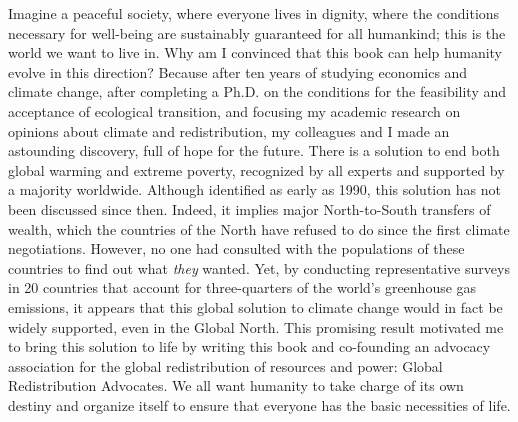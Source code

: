 \documentclass[a5paper,english,openany]{memoir}
\begin{document}
Imagine a peaceful society, where everyone lives in dignity, where the conditions necessary for well-being are sustainably guaranteed for all humankind; this is the world we want to live in.
Why am I convinced that this book can help humanity evolve in this direction? Because after ten years of studying economics and climate change, after completing a Ph.D. %
on the conditions for the feasibility and acceptance of ecological transition, %
and focusing my academic research on opinions about climate and redistribution, my colleagues and I made an astounding discovery, full of hope for the future. %
There is a solution to end both global warming and extreme poverty, recognized %
by all %
experts and supported by a majority worldwide. 
Although identified as early as 1990, this solution has not been discussed 
since then. Indeed, it implies major North-to-South %
transfers of wealth, which the countries of the North have refused to do since the first climate negotiations. However, %
no one had consulted with the populations of these countries to find out what \textit{they} %
wanted. Yet, %
by conducting representative surveys in 20 countries that account for three-quarters of the world's greenhouse gas emissions, it appears that this global solution to climate change would in fact be widely supported, even in the Global North. 
This promising result motivated me to bring this solution to life by writing this book and co-founding an advocacy association for the global redistribution of resources and power: %
Global Redistribution Advocates.
We all want humanity to take charge of its own destiny and organize %
itself to ensure that everyone has the basic necessities of life.%
\end{document}
